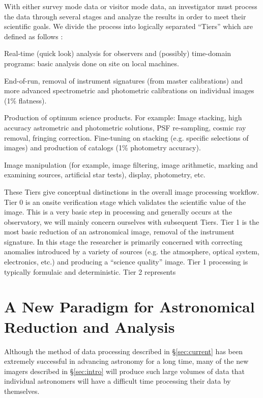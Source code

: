 \documentclass[10pt,conference]{IEEEtran}
\begin{document}
With either survey mode data or visitor mode data, an investigator must process the data through several stages and analyze the results in order to meet their scientific goals. We divide the process into logically separated ``Tiers'' which are defined as follows \cite{PASRD}:
\begin{description} 
\item[\bf Tier 0] Real-time (quick look) analysis for observers and (possibly) time-domain
programs: basic analysis done on site on local machines. 
\item[\bf Tier 1] End-of-run, removal of instrument signatures (from master calibrations) and more
advanced spectrometric and photometric calibrations on individual images (1\% flatness).
\item[\bf Tier 2] Production of optimum science products. For example: Image stacking, high
accuracy astrometric and photometric solutions, PSF re-sampling, cosmic ray removal,
fringing correction. Fine-tuning on stacking (e.g. specific selections of images) and
production of catalogs (1\% photometry accuracy).
\item[\bf Tier 3] Image manipulation (for example, image filtering, image arithmetic, marking and
examining sources, artificial star tests), display, photometry, etc.
\end{description}

These Tiers give conceptual distinctions in the overall image processing workflow. Tier 0 is an onsite verification stage which validates the scientific value of the image. This is a very basic step in processing and generally occurs at the observatory, we will mainly concern ourselves with subsequent Tiers. Tier 1 is the most basic reduction of an astronomical image, removal of the instrument signature. In this stage the researcher is primarily concerned with correcting anomalies introduced by a variety of sources (e.g. the atmosphere, optical system, electronics, etc.) and producing a ``science quality'' image. Tier 1 processing is typically formulaic and deterministic. Tier 2 represents 

\section{A New Paradigm for Astronomical Reduction and Analysis}\label{sec:rev}

Although the method of data processing described in \S\ref{sec:current} has been extremely successful in advancing astronomy for a long time, many of the new imagers described in \S\ref{sec:intro} will produce such large volumes of data that individual astronomers will have a difficult time
processing their data by themselves. 
\end{document}
